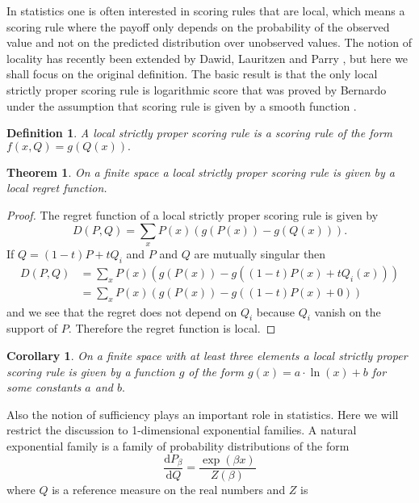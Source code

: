 \documentclass[10pt,a4paper,draft]{article}
\newtheorem{cor}{Corollary}
\newtheorem{thm}{Theorem}
\newtheorem{Definition}{Definition}
\begin{document}
In statistics one is often interested in scoring rules that are
local, which means a scoring rule where the payoff only depends on the
probability of the observed value and not on the predicted distribution over
unobserved values. The notion of locality has recently been extended by
Dawid, Lauritzen and Parry \cite{Dawid2012}, but here we shall focus on the original definition. The basic result is that the only
local strictly proper scoring rule is logarithmic score that was proved by Bernardo under the assumption that scoring rule is given by a smooth function \cite{Bernardo1978}.
\begin{Definition}
A \emph{local strictly proper scoring rule} is a scoring rule of
the form $f\left(x,Q\right)=g\left(Q\left(x\right)\right).$
\end{Definition}
\begin{thm}
On a finite space a local strictly proper scoring rule is given by a local regret function.
\end{thm}
\begin{proof}
The regret function of a local strictly proper scoring rule is
given by 
\[
D\left(P,Q\right)=\sum_{x}P\left(x\right)\left(g\left(P\left(x\right)\right)-g\left(Q\left(x\right)\right)\right).
\]
If $Q=\left(1-t\right)P+tQ_{i}$ and $P$ and $Q$ are mutually
singular then
\begin{align*}
D\left(P,Q\right) &
=\sum_{x}P\left(x\right)\left(g\left(P\left(x\right)\right)-g\left(\left(1-t\right)P\left(x\right)+tQ_{i}\left(x\right)\right)\right)\\
&
=\sum_{x}P\left(x\right)\left(g\left(P\left(x\right)\right)-g\left(\left(1-t\right)P\left(x\right)+0\right)\right)
\end{align*}
and we see that the regret does not depend on $Q_{i}$ because
$Q_{i}$
vanish on the support of $P.$ Therefore the regret function is
local.
\end{proof}
\begin{cor}
On a finite space with at least three elements a  local strictly proper
scoring rule is given by a function $g$ of the form
$g\left(x\right)=a\cdot\ln\left(x\right)+b$
for some constants $a$ and $b.$
\end{cor}
Also the notion of sufficiency plays an important role in
statistics. Here we will restrict the discussion to 1-dimensional
exponential families. A natural exponential family is a family of
probability distributions of the form
\[
\frac{\mathrm{d}P_{\beta}}{\mathrm{d}Q}=\frac{\exp\left(\beta
x\right)}{Z\left(\beta\right)}
\]
where $Q$ is a reference measure on the real numbers and $Z$ is
\end{document}
